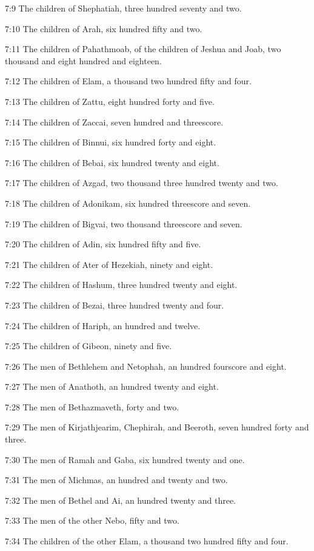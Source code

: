 7:9 The children of Shephatiah, three hundred seventy and two.

7:10 The children of Arah, six hundred fifty and two.

7:11 The children of Pahathmoab, of the children of Jeshua and Joab,
two thousand and eight hundred and eighteen.

7:12 The children of Elam, a thousand two hundred fifty and four.

7:13 The children of Zattu, eight hundred forty and five.

7:14 The children of Zaccai, seven hundred and threescore.

7:15 The children of Binnui, six hundred forty and eight.

7:16 The children of Bebai, six hundred twenty and eight.

7:17 The children of Azgad, two thousand three hundred twenty and two.

7:18 The children of Adonikam, six hundred threescore and seven.

7:19 The children of Bigvai, two thousand threescore and seven.

7:20 The children of Adin, six hundred fifty and five.

7:21 The children of Ater of Hezekiah, ninety and eight.

7:22 The children of Hashum, three hundred twenty and eight.

7:23 The children of Bezai, three hundred twenty and four.

7:24 The children of Hariph, an hundred and twelve.

7:25 The children of Gibeon, ninety and five.

7:26 The men of Bethlehem and Netophah, an hundred fourscore and
eight.

7:27 The men of Anathoth, an hundred twenty and eight.

7:28 The men of Bethazmaveth, forty and two.

7:29 The men of Kirjathjearim, Chephirah, and Beeroth, seven hundred
forty and three.

7:30 The men of Ramah and Gaba, six hundred twenty and one.

7:31 The men of Michmas, an hundred and twenty and two.

7:32 The men of Bethel and Ai, an hundred twenty and three.

7:33 The men of the other Nebo, fifty and two.

7:34 The children of the other Elam, a thousand two hundred fifty and
four.

